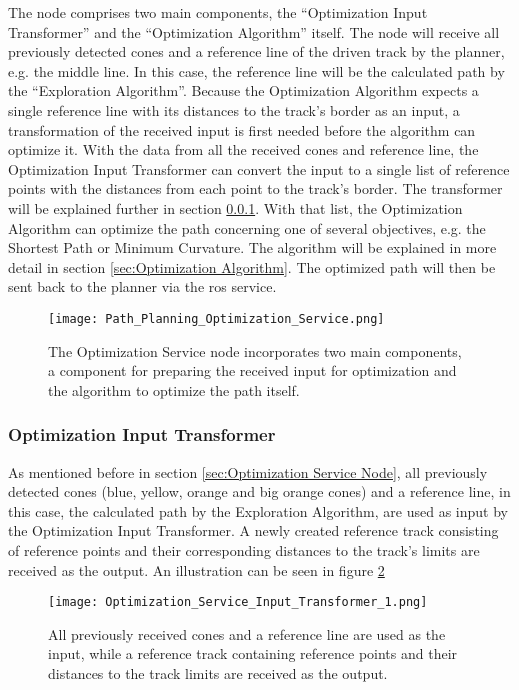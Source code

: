 The node comprises two main components, the ``Optimization Input Transformer'' and the ``Optimization Algorithm'' itself. The node will receive all previously detected cones and a reference line of the driven track by the planner, e.g. the middle line. In this case, the reference line will be the calculated path by the ``Exploration Algorithm''. Because the Optimization Algorithm expects a single reference line with its distances to the track's border as an input, a transformation of the received input is first needed before the algorithm can optimize it. With the data from all the received cones and reference line, the Optimization Input Transformer can convert the input to a single list of reference points with the distances from each point to the track's border. The transformer will be explained further in section \ref{sec:Optimization Input Transformer}. With that list, the Optimization Algorithm can optimize the path concerning one of several objectives, e.g. the Shortest Path or Minimum Curvature. The algorithm will be explained in more detail in section \ref{sec:Optimization Algorithm}. The optimized path will then be sent back to the planner via the \acrshort{ros} service.
\begin{figure}[H]
    \centering
    \texttt{[image: Path\_Planning\_Optimization\_Service.png]}
    \caption{The Optimization Service node incorporates two main components, a component for preparing the received input for optimization and the algorithm to optimize the path itself.}
    \label{fig:Path Planning Optimization Service Node}
\end{figure}

\subsubsection{Optimization Input Transformer} \label{sec:Optimization Input Transformer}
As mentioned before in section \ref{sec:Optimization Service Node}, all previously detected cones (blue, yellow, orange and big orange cones) and a reference line, in this case, the calculated path by the Exploration Algorithm, are used as input by the Optimization Input Transformer. A newly created reference track consisting of reference points and their corresponding distances to the track's limits are received as the output. An illustration can be seen in figure \ref{fig:Optimization Service Input Transformer 1}
\begin{figure}[H]
    \centering
    \texttt{[image: Optimization\_Service\_Input\_Transformer\_1.png]}
    \caption{All previously received cones and a reference line are used as the input, while a reference track containing reference points and their distances to the track limits are received as the output.}
    \label{fig:Optimization Service Input Transformer 1}
\end{figure}

